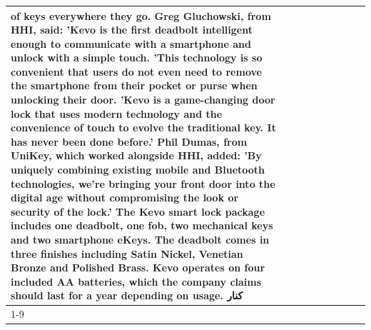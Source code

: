 \begin{table}[H]
\begin{tabular}{lllrlllll}
of keys everywhere they go. Greg Gluchowski, from HHI, said: 'Kevo is the first deadbolt intelligent enough to communicate with a smartphone and unlock with a simple touch. 'This technology is so convenient that users do not even need to remove the smartphone from their pocket or purse when unlocking their door. 'Kevo is a game-changing door lock that uses modern technology and the convenience of touch to evolve the traditional key. It has never been done before.' Phil Dumas, from UniKey, which worked alongside HHI, added: 'By uniquely combining existing mobile and Bluetooth technologies, we’re bringing your front door into the digital age without compromising the look or security of the lock.' The Kevo smart lock package includes one deadbolt, one fob, two mechanical keys and two smartphone eKeys. The deadbolt comes in three finishes including Satin Nickel, Venetian Bronze and Polished Brass. Kevo operates on four included AA batteries, which the company claims should last for a year depending on usage. کنار \\
\cline{1-9}

\end{tabular}
\end{table}
